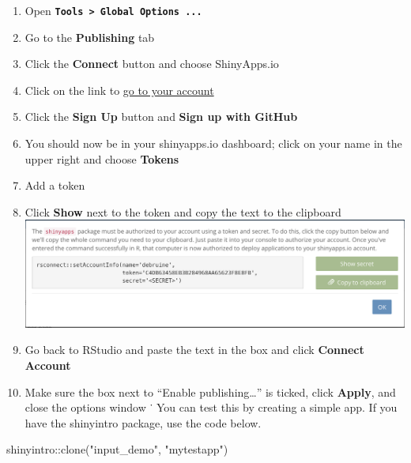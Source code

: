 \documentclass[
]{book}
\newenvironment{Shaded}{\begin{snugshade}}{\end{snugshade}}
\newcommand{\FunctionTok}[1]{\textcolor[rgb]{0.00,0.00,0.00}{#1}}
\newcommand{\NormalTok}[1]{#1}
\newcommand{\SpecialCharTok}[1]{\textcolor[rgb]{0.00,0.00,0.00}{#1}}
\newcommand{\StringTok}[1]{\textcolor[rgb]{0.31,0.60,0.02}{#1}}
\providecommand{\tightlist}{%
  \setlength{\itemsep}{0pt}\setlength{\parskip}{0pt}}
\begin{document}
\begin{enumerate}
\def\labelenumi{\arabic{enumi}.}
\tightlist
\item
  Open \textbf{\texttt{Tools\ \textgreater{}\ Global\ Options\ ...}}
\item
  Go to the \textbf{Publishing} tab
\item
  Click the \textbf{Connect} button and choose ShinyApps.io
\item
  Click on the link to \href{https://www.shinyapps.io/}{go to your account}
\item
  Click the \textbf{Sign Up} button and \textbf{Sign up with GitHub}
\item
  You should now be in your shinyapps.io dashboard; click on your name in the upper right and choose \textbf{Tokens}
\item
  Add a token
\item
  Click \textbf{Show} next to the token and copy the text to the clipboard
  \includegraphics{images/saio_secret.png}
\item
  Go back to RStudio and paste the text in the box and click \textbf{Connect Account}
\item
  Make sure the box next to ``Enable publishing\ldots{}'' is ticked, click \textbf{Apply}, and close the options window
  ˙
  You can test this by creating a simple app. If you have the shinyintro package, use the code below.
\end{enumerate}

\begin{Shaded}
\begin{Highlighting}[]
\NormalTok{shinyintro}\SpecialCharTok{::}\FunctionTok{clone}\NormalTok{(}\StringTok{"input\_demo"}\NormalTok{, }\StringTok{"mytestapp"}\NormalTok{)}
\end{Highlighting}
\end{Shaded}
\end{document}
